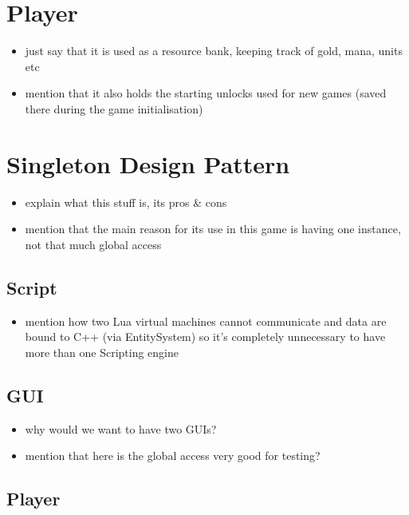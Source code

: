 \section{Player}

\begin{itemize}
    \item just say that it is used as a resource bank, keeping track
        of gold, mana, units etc
    \item mention that it also holds the starting unlocks used for new games
        (saved there during the game initialisation)
\end{itemize}

\section{Singleton Design Pattern}

\begin{itemize}
    \item explain what this stuff is, its pros \& cons
    \item mention that the main reason for its use in this game
        is having one instance, not that much global access
\end{itemize}

\subsection{Script}

\begin{itemize}
    \item mention how two Lua virtual machines cannot communicate
        and data are bound to C++ (via EntitySystem) so it's completely
        unnecessary to have more than one Scripting engine
\end{itemize}

\subsection{GUI}

\begin{itemize}
    \item why would we want to have two GUIs?
    \item mention that here is the global access very good for testing?
\end{itemize}

\subsection{Player}

